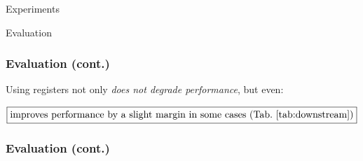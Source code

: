 \documentclass[aspectratio=169]{beamer}
\begin{document}
\begin{section}{Experiments}
\begin{subsection}{Evaluation}
\begin{frame}
\end{frame}

\begin{frame}
\frametitle{Evaluation (cont.)}

Using registers not only \emph{does not degrade performance}, but even:

$$
\boxed{\text{improves performance by a slight margin in some cases (Tab.~\ref{tab:downstream})}}
$$

\end{frame}

    




\begin{frame}
\frametitle{Evaluation (cont.)}

\begin{table}[h]
    \centering
    \caption{
        Evaluation of downstream performance of the models that we trained, with and without registers.
      }  
    \hspace{3em}
    \label{tab:downstream}
\end{table}


\end{frame}
\end{subsection}
\end{section}
\end{document}
